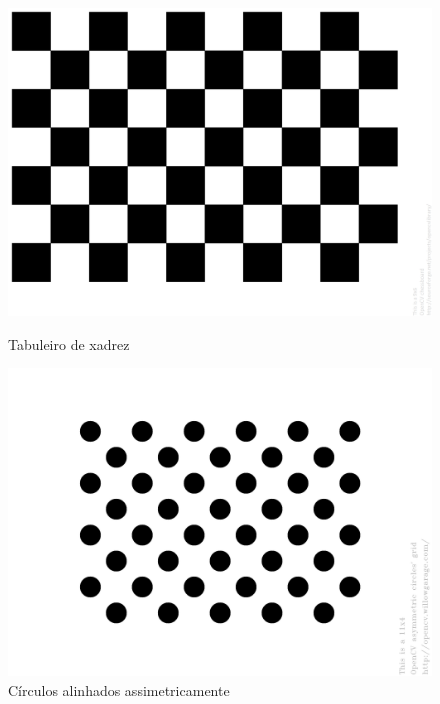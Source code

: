 \begin{figure}[!htb]
  \includegraphics[width=\linewidth]{Imagens/figura3-3E3-12.png}
  \caption{Tabuleiro de xadrez}\label{fig3:3}
\endminipage\hfill
{}
  \includegraphics[width=\linewidth]{Imagens/figura3-4.png}
  \caption{Círculos alinhados assimetricamente}\label{fig3:4}
\endminipage\hfill
{}

\end{figure}
